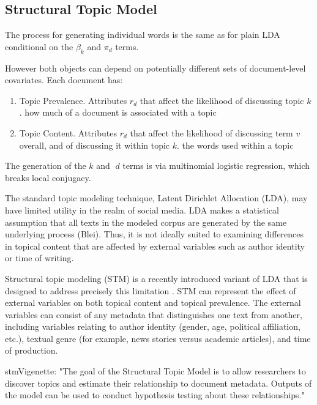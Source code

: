 \documentclass[12pt,a4paper,notitlepage]{article}
\begin{document}
\subsection{Structural Topic Model}

The process for generating individual words is the same as for plain LDA conditional on the $\beta_k$ and $\pi_d$ terms. 

However both objects can depend on potentially different sets of document-level covariates. Each document has:
\begin{enumerate}
	\item Topic Prevalence. Attributes $r_d$ that affect the likelihood of discussing topic $k$. how much of a document is associated with a topic
	\item Topic Content. Attributes $r_d$ that affect the likelihood of discussing term $v$ overall, and of discussing it within topic $k$. the words used within a topic
\end{enumerate}

The generation of the $k$ and $d$ terms is via multinomial logistic regression, which breaks local conjugacy.

The standard topic modeling technique, Latent Dirichlet Allocation (LDA), may have limited utility in the realm of social media. LDA makes a statistical assumption that all texts in the modeled corpus are generated by the same underlying process (Blei). Thus, it is not ideally suited to examining differences in topical content that are affected by external variables such as author identity or time of writing.

Structural topic modeling (STM) is a recently introduced variant of LDA that is designed to address precisely this limitation . STM can represent the effect of external variables on both topical content and topical prevalence. The external variables can consist of any metadata that distinguishes one text from another, including variables relating to author identity (gender, age, political affiliation, etc.), textual genre (for example, news stories versus academic articles), and time of production.

stmVigenette: "The goal of the Structural Topic Model is to allow researchers to discover topics and estimate their relationship to document metadata. Outputs of the model can be used to conduct hypothesis testing about these relationships."  
\end{document}

